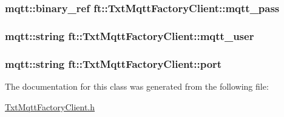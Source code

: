 \subsubsection[{\texorpdfstring{mqtt\+\_\+pass}{mqtt_pass}}]{\setlength{\rightskip}{0pt plus 5cm}mqtt\+::binary\+\_\+ref ft\+::\+Txt\+Mqtt\+Factory\+Client\+::mqtt\+\_\+pass\hspace{0.3cm}{\ttfamily [protected]}}\hypertarget{classft_1_1_txt_mqtt_factory_client_abb1d5f2fd93c87710ad4ea57d3d6702b}{}\label{classft_1_1_txt_mqtt_factory_client_abb1d5f2fd93c87710ad4ea57d3d6702b}
\subsubsection[{\texorpdfstring{mqtt\+\_\+user}{mqtt_user}}]{\setlength{\rightskip}{0pt plus 5cm}mqtt\+::string ft\+::\+Txt\+Mqtt\+Factory\+Client\+::mqtt\+\_\+user\hspace{0.3cm}{\ttfamily [protected]}}\hypertarget{classft_1_1_txt_mqtt_factory_client_ab4c4b9312d3df970892ae26c143eb5ff}{}\label{classft_1_1_txt_mqtt_factory_client_ab4c4b9312d3df970892ae26c143eb5ff}
\subsubsection[{\texorpdfstring{port}{port}}]{\setlength{\rightskip}{0pt plus 5cm}mqtt\+::string ft\+::\+Txt\+Mqtt\+Factory\+Client\+::port\hspace{0.3cm}{\ttfamily [protected]}}\hypertarget{classft_1_1_txt_mqtt_factory_client_af60c5887f1eae5dc4039fa284eb2b0b6}{}\label{classft_1_1_txt_mqtt_factory_client_af60c5887f1eae5dc4039fa284eb2b0b6}


The documentation for this class was generated from the following file\+:\begin{DoxyCompactItemize}
\item 
\hyperlink{_txt_mqtt_factory_client_8h}{Txt\+Mqtt\+Factory\+Client.\+h}\end{DoxyCompactItemize}
